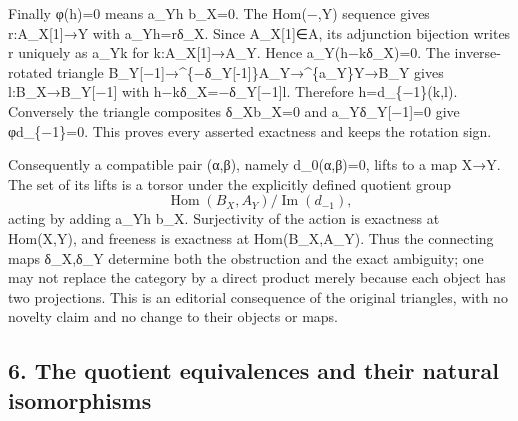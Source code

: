 \documentclass[11pt]{article}
\begin{document}
Finally φ(h)\allowbreak{}\allowbreak{}=0 means a\_\allowbreak{}Yh b\_\allowbreak{}X\allowbreak{}=0. The Hom(−,\allowbreak{}Y)\allowbreak{} sequence gives r:\allowbreak{}A\_\allowbreak{}X[1]\allowbreak{}\allowbreak{}→Y with a\_\allowbreak{}Yh\allowbreak{}=rδ\_\allowbreak{}X. Since A\_\allowbreak{}X[1]\allowbreak{}\allowbreak{}∈A,\allowbreak{} its adjunction bijection writes r uniquely as a\_\allowbreak{}Yk for k:\allowbreak{}A\_\allowbreak{}X[1]\allowbreak{}\allowbreak{}→A\_\allowbreak{}Y. Hence a\_\allowbreak{}Y(h−kδ\_\allowbreak{}X)\allowbreak{}\allowbreak{}=0. The inverse-rotated triangle B\_\allowbreak{}Y[−1]\allowbreak{}\allowbreak{}→\textasciicircum{}\{−δ\_\allowbreak{}Y[-1]\allowbreak{}\}A\_\allowbreak{}Y\allowbreak{}→\textasciicircum{}\{a\_\allowbreak{}Y\}Y\allowbreak{}→B\_\allowbreak{}Y gives l:\allowbreak{}B\_\allowbreak{}X\allowbreak{}→B\_\allowbreak{}Y[−1]\allowbreak{} with h−kδ\_\allowbreak{}X\allowbreak{}=−δ\_\allowbreak{}Y[−1]\allowbreak{}l. Therefore h\allowbreak{}=d\_\allowbreak{}\{−1\}(k,\allowbreak{}l)\allowbreak{}. Conversely the triangle composites δ\_\allowbreak{}Xb\_\allowbreak{}X\allowbreak{}=0 and a\_\allowbreak{}Yδ\_\allowbreak{}Y[−1]\allowbreak{}\allowbreak{}=0 give φd\_\allowbreak{}\{−1\}\allowbreak{}=0. This proves every asserted exactness and keeps the rotation sign.

Consequently a compatible pair (α,\allowbreak{}β)\allowbreak{},\allowbreak{} namely d\_\allowbreak{}0(α,\allowbreak{}β)\allowbreak{}\allowbreak{}=0,\allowbreak{} lifts to a map X\allowbreak{}→Y. The set of its lifts is a torsor under the explicitly defined quotient group \[
 \operatorname{Hom}(B_X,A_Y)/\operatorname{Im}(d_{-1}),
\] acting by adding a\_\allowbreak{}Yh b\_\allowbreak{}X. Surjectivity of the action is exactness at Hom(X,\allowbreak{}Y)\allowbreak{},\allowbreak{} and freeness is exactness at Hom(B\_\allowbreak{}X,\allowbreak{}A\_\allowbreak{}Y)\allowbreak{}. Thus the connecting maps δ\_\allowbreak{}X,\allowbreak{}δ\_\allowbreak{}Y determine both the obstruction and the exact ambiguity; one may not replace the category by a direct product merely because each object has two projections. This is an editorial consequence of the original triangles,\allowbreak{} with no novelty claim and no change to their objects or maps.

\subsection{6. The quotient equivalences and their natural isomorphisms}\label{proofs-11665-12003-the-quotient-equivalences-and-their-natural-isomorphisms}
\end{document}
